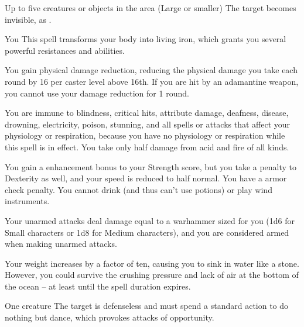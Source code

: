 \spelldur{\durshort \dismissable}
\begin{spelltargets}{Up to five creatures or objects in the area (Large or smaller)}
    \spelleffect The target becomes invisible, as .
\end{spelltargets}

\spelldur{\durshort \dismissable}
\begin{spelltarget}{You}
    \spelleffect This spell transforms your body into living iron, which grants you several powerful resistances and abilities.
    \par You gain physical damage reduction, reducing the physical damage you take each round by 16  per caster level above 16th. If you are hit by an adamantine weapon, you cannot use your damage reduction for 1 round.
    \par You are immune to blindness, critical hits, attribute damage, deafness, disease, drowning, electricity, poison, stunning, and all spells or attacks that affect your physiology or respiration, because you have no physiology or respiration while this spell is in effect. You take only half damage from acid and fire of all kinds.
    \par You gain a  enhancement bonus to your Strength score, but you take a  penalty to Dexterity as well, and your speed is reduced to half normal. You have a  armor check penalty. You cannot drink (and thus can't use potions) or play wind instruments.
    \par Your unarmed attacks deal damage equal to a warhammer sized for you (1d6 for Small characters or 1d8 for Medium characters), and you are considered armed when making unarmed attacks.
    \par Your weight increases by a factor of ten, causing you to sink in water like a stone. However, you could survive the crushing pressure and lack of air at the bottom of the ocean -- at least until the spell duration expires.
\end{spelltarget}

\spellrng{\rngclose}
\begin{spelltarget}{One creature}
    \spelleffect The target is defenseless and must spend a standard action to do nothing but dance, which provokes attacks of opportunity.
\end{spelltarget}

